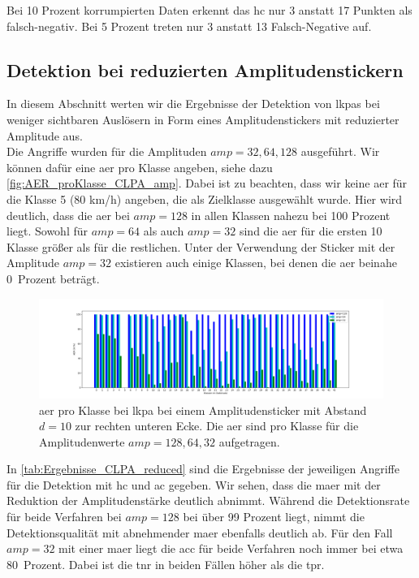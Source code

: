 \documentclass[twoside, 12pt,a4paper]{book}
\numberwithin{equation}{section}
\begin{document}
	\noindent Bei 10 Prozent korrumpierten Daten erkennt das \ac{hc} nur 3 anstatt 17 Punkten als falsch-negativ. Bei 5 Prozent treten nur 3 anstatt 13 Falsch-Negative auf.

	
	\subsection{Detektion bei reduzierten Amplitudenstickern}
	In diesem Abschnitt werten wir die Ergebnisse der Detektion von \acp{lkpa} bei weniger sichtbaren Auslösern in Form eines Amplitudenstickers mit reduzierter Amplitude aus.\\
	
	\noindent Die Angriffe wurden für die Amplituden $amp=32,64,128$ ausgeführt. Wir können dafür eine \ac{aer} pro Klasse angeben, siehe dazu \autoref{fig:AER_proKlasse_CLPA_amp}. Dabei ist zu beachten, dass wir keine \ac{aer} für die Klasse 5 (80 km/h) angeben, die als Zielklasse ausgewählt wurde. Hier wird deutlich, dass die \ac{aer} bei ${amp = 128}$ in allen Klassen nahezu bei 100 Prozent liegt. Sowohl für ${amp = 64}$ als auch $amp=32$ sind die \ac{aer} für die ersten 10 Klasse größer als für die restlichen. Unter der Verwendung der Sticker mit der Amplitude $amp=32$ existieren auch einige Klassen, bei denen die \ac{aer} beinahe 0~Prozent beträgt.
	
	\begin{figure}[!h]
		\begin{center}
			\includegraphics[width=\textwidth]{vergleich_CLPA_AER_amp.png}
			\caption[\ac{aer} pro Klasse bei LkPAs]{\ac{aer} pro Klasse bei \ac{lkpa} bei einem Amplitudensticker mit Abstand $d=10$ zur rechten unteren Ecke. Die \ac{aer} sind pro Klasse für die Amplitudenwerte $amp=128,64,32$ aufgetragen.}
			\label{fig:AER_proKlasse_CLPA_amp}
		\end{center}
	\end{figure}
	
	\noindent In \autoref{tab:Ergebnisse_CLPA_reduced} sind die Ergebnisse der jeweiligen Angriffe für die Detektion mit \ac{hc} und \ac{ac} gegeben. Wir sehen, dass die \ac{maer} mit der Reduktion der Amplitudenstärke deutlich abnimmt. Während die Detektionsrate für beide Verfahren bei $amp=128$ bei über 99 Prozent liegt, nimmt die Detektionsqualität mit abnehmender \ac{maer} ebenfalls deutlich ab. Für den Fall $amp=32$ mit einer \ac{maer} liegt die \ac{acc} für beide Verfahren noch immer bei etwa 80~Prozent. Dabei ist die \ac{tnr} in beiden Fällen höher als die \ac{tpr}. \\
	
\end{document}

